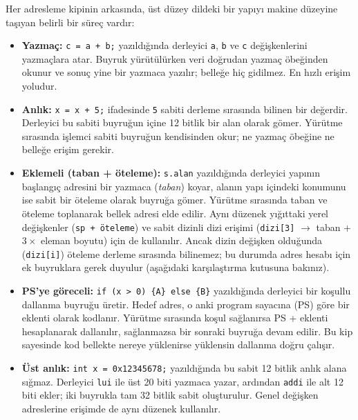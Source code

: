 Her adresleme kipinin arkasında, üst düzey dildeki bir yapıyı makine düzeyine taşıyan belirli bir süreç vardır:

\begin{itemize}[nosep, leftmargin=*]
\item \textbf{Yazmaç:} \texttt{c = a + b;} yazıldığında derleyici \texttt{a}, \texttt{b} ve \texttt{c} değişkenlerini yazmaçlara atar. Buyruk yürütülürken veri doğrudan yazmaç öbeğinden okunur ve sonuç yine bir yazmaca yazılır; belleğe hiç gidilmez. En hızlı erişim yoludur.

\item \textbf{Anlık:} \texttt{x = x + 5;} ifadesinde \texttt{5} sabiti derleme sırasında bilinen bir değerdir. Derleyici bu sabiti buyruğun içine 12 bitlik bir alan olarak gömer. Yürütme sırasında işlemci sabiti buyruğun kendisinden okur; ne yazmaç öbeğine ne belleğe erişim gerekir.

\item \textbf{Eklemeli (taban + öteleme):} \texttt{s.alan} yazıldığında derleyici yapının başlangıç adresini bir yazmaca (\emph{taban}) koyar, alanın yapı içindeki konumunu ise sabit bir öteleme olarak buyruğa gömer. Yürütme sırasında taban ve öteleme toplanarak bellek adresi elde edilir. Aynı düzenek yığıttaki yerel değişkenler (\texttt{sp + öteleme}) ve sabit dizinli dizi erişimi (\texttt{dizi[3]} $\rightarrow$ taban + $3 \times$ eleman boyutu) için de kullanılır. Ancak dizin değişken olduğunda (\texttt{dizi[i]}) öteleme derleme sırasında bilinemez; bu durumda adres hesabı için ek buyruklara gerek duyulur (aşağıdaki karşılaştırma kutusuna bakınız).

\item \textbf{PS'ye göreceli:} \texttt{if (x > 0) \{A\} else \{B\}} yazıldığında derleyici bir koşullu dallanma buyruğu üretir. Hedef adres, o anki program sayacına (PS) göre bir eklenti olarak kodlanır. Yürütme sırasında koşul sağlanırsa PS + eklenti hesaplanarak dallanılır, sağlanmazsa bir sonraki buyruğa devam edilir. Bu kip sayesinde kod bellekte nereye yüklenirse yüklensin dallanma doğru çalışır.

\item \textbf{Üst anlık:} \texttt{int x = 0x12345678;} yazıldığında bu sabit 12 bitlik anlık alana sığmaz. Derleyici \texttt{lui} ile üst 20 biti yazmaca yazar, ardından \texttt{addi} ile alt 12 biti ekler; iki buyrukla tam 32 bitlik sabit oluşturulur. Genel değişken adreslerine erişimde de aynı düzenek kullanılır.
\end{itemize}

